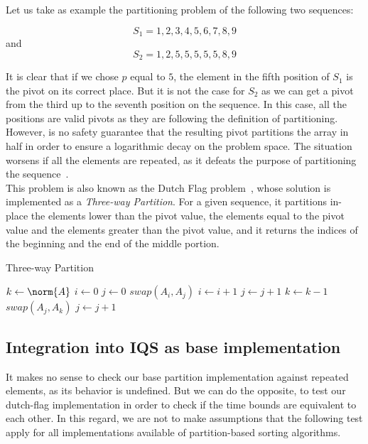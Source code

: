 Let us take as example the partitioning problem of the following two sequences:

$$ S_1={1,2,3,4,5,6,7,8,9} $$
and
$$S_2={1,2,5,5,5,5,5,8,9}$$

It is clear that if we chose $p$ equal to $5$, the element in the fifth position of $S_1$ is the pivot on its correct place. But it is not the case for $S_2$ as we can get a pivot from the third up to the seventh position on the sequence. In this case, all the positions are valid pivots as they are following the definition of partitioning. However, is no safety guarantee that the resulting pivot  partitions the array in half in order to ensure a logarithmic decay on the problem space. The situation worsens if all the elements are repeated, as it defeats the purpose of partitioning the sequence~\cite{7416566}.\\

This problem is also known as the Dutch Flag problem~\cite{10.5555/550359}, whose solution is implemented as a \emph{Three-way Partition}. For a given sequence, it partitions in-place the elements lower than the pivot value, the elements equal to the pivot value and the elements greater than the pivot value, and it returns the indices of the beginning and the end of the middle portion.\\

\begin{algorithm}
\caption{Three-way Partition}\label{ALG:DUTCH_FLAG_PARTITION}
\begin{algorithmic}[1]
     
    \State $k \gets \norm{A}$
    \State $i \gets 0$
    \State $j \gets 0$
            \State $swap(A_i, A_j)$
            \State $i \gets i+1$
            \State $j \gets j+1$
            \State $k \gets k-1$
            \State $swap(A_j, A_k)$
        \Else
            \State $j \gets j+1$
        \EndIf
    \EndWhile
    \EndProcedure
\end{algorithmic}
\end{algorithm}

\subsection{Integration into IQS as base implementation}

It makes no sense to check our base partition implementation against repeated elements, as its behavior is undefined. But we can do the opposite, to test our dutch-flag implementation in order to check if the time bounds are equivalent to each other. In this regard, we are not to make assumptions that the following test apply for all implementations available of partition-based sorting algorithms.\\


